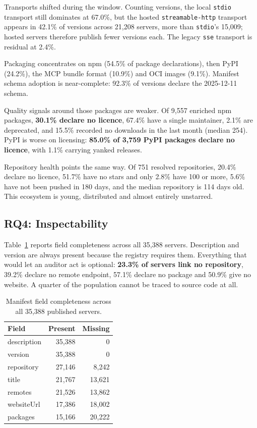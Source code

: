 \documentclass[a4paper,fleqn]{cas-dc}
\begin{document}
Transports shifted during the window. Counting versions, the local
\texttt{stdio} transport still dominates at 67.0\%, but the hosted
\texttt{streamable-http} transport appears in 42.1\% of versions across 21,208
servers, more than \texttt{stdio}'s 15,009; hosted servers therefore publish
fewer versions each. The legacy \texttt{sse} transport is
residual at 2.4\%.

Packaging concentrates on npm (54.5\% of package declarations), then PyPI
(24.2\%), the MCP bundle format (10.9\%) and OCI images (9.1\%). Manifest schema
adoption is near-complete: 92.3\% of versions declare the 2025-12-11 schema.

Quality signals around those packages are weaker. Of 9,557 enriched npm
packages, \textbf{30.1\% declare no licence}, 67.4\% have a single maintainer,
2.1\% are deprecated, and 15.5\% recorded no downloads in the last month
(median 254). PyPI is worse on licensing: \textbf{85.0\% of 3,759 PyPI packages
declare no licence}, with 1.1\% carrying yanked releases.

Repository health points the same way. Of 751 resolved repositories, 20.4\%
declare no licence, 51.7\% have no stars and only 2.8\% have 100 or more, 5.6\%
have not been pushed in 180 days, and the median repository is 114 days old.
This ecosystem is young, distributed and almost entirely unstarred.

\subsection{RQ4: Inspectability}\label{sec:rq4}

Table~\ref{tab:completeness} reports field completeness across all 35,388
servers. Description and version are always present because the registry
requires them. Everything that would let an auditor act is optional:
\textbf{23.3\% of servers link no repository}, 39.2\% declare no remote
endpoint, 57.1\% declare no package and 50.9\% give no website. A quarter of
the population cannot be traced to source code at all.

\begin{table}[t]
\caption{Manifest field completeness across all 35,388 published servers.}
\label{tab:completeness}
\centering
\begin{tabular}{@{}lrr@{}}
\toprule
Field & Present & Missing \\
\midrule
description & 35,388 & 0 \\
version & 35,388 & 0 \\
repository & 27,146 & 8,242 \\
title & 21,767 & 13,621 \\
remotes & 21,526 & 13,862 \\
websiteUrl & 17,386 & 18,002 \\
packages & 15,166 & 20,222 \\
\bottomrule
\end{tabular}
\end{table}
\end{document}
